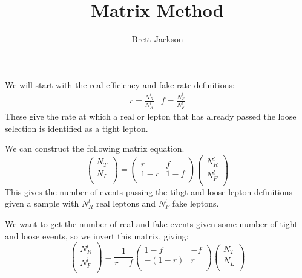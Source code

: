 \documentclass[11pt,a4paper]{article}
\title{Matrix Method}
\author{Brett Jackson}
\begin{document}
  \maketitle

  We will start with the real efficiency and fake rate definitions:
  \[
    \begin{array}{cc}
      r = \frac{N_{R}^{t}}{N_{R}^{l}} &
      f = \frac{N_{F}^{t}}{N_{F}^{l}}
    \end{array}
  \]
  These give the rate at which a real or lepton that has already passed the
  loose selection is identified as a tight lepton.

  We can construct the following matrix equation.
  \[
    \left(
      \begin{array}{c}
        N_T \\
        N_L \\
      \end{array}
    \right)
    =
    \left(
      \begin{array}{cc}
        r & f \\
        1-r & 1-f \\
      \end{array}
    \right)
    \left(
      \begin{array}{c}
        N_{R}^{l} \\
        N_{F}^{l} \\
      \end{array}
    \right)
  \]
  This gives the number of events passing the tihgt and loose lepton definitions
  given a sample with $N_{R}^{l}$ real leptons and $N_{F}^{l}$ fake leptons.
  
  We want to get the number of real and fake events given some number of tight
  and loose events, so we invert this matrix, giving:
  \[
    \left(
      \begin{array}{c}
        N_{R}^{l} \\
        N_{F}^{l} \\
      \end{array}
    \right)
    =
    \frac{1}{r-f}
    \left(
      \begin{array}{cc}
        1-f & -f \\
        -(1-r) & r \\
      \end{array}
    \right)
    \left(
      \begin{array}{c}
        N_T \\
        N_L \\
      \end{array}
    \right)
  \]
\end{document}
